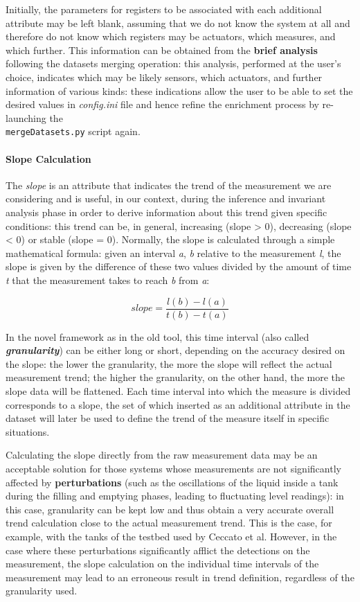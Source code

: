 Initially, the parameters for registers to be associated with each additional attribute may be left blank, assuming that we do not know the system at all and therefore do not know which registers may be actuators, which measures, and which further. This information can be obtained from the \textbf{brief analysis} following the datasets merging operation: this analysis, performed at the user's choice, indicates which may be likely sensors, which actuators, and further information of various kinds: these indications allow the user to be able to set the desired values in \textit{config.ini} file and hence refine the enrichment process by re-launching the\\ 
\texttt{mergeDatasets.py} script again.

\paragraph{Slope Calculation}
The \textit{slope} is an attribute that indicates the trend of the measurement we are considering and is useful, in our context, during the inference and invariant analysis phase in order to derive information about this trend given specific conditions: this trend can be, in general, increasing (slope > 0), decreasing (slope < 0) or stable (slope = 0).\newline
Normally, the slope is calculated through a simple mathematical formula: given an interval \textit{a}, \textit{b} relative to the measurement \textit{l}, the slope is given by the difference of these two values divided by the amount of time \textit{t} that the measurement takes to reach \textit{b} from \textit{a}:

\[slope = \frac{l(b) -l(a)}{t(b) - t(a)}\]

In the novel framework as in the old tool, this time interval (also called \textbf{\textit{granularity}}) can be either long or short, depending on the accuracy desired on the slope: the lower the granularity, the more the slope will reflect the actual measurement trend; the higher the granularity, on the other hand, the more the slope data will be flattened. Each time interval into which the measure is divided corresponds to a slope, the set of which inserted as an additional attribute in the dataset will later be used to define the trend of the measure itself in specific situations.

\bigskip
Calculating the slope directly from the raw measurement data may be an acceptable solution for those systems whose measurements are not significantly affected by \textbf{perturbations} (such as the oscillations of the liquid inside a tank during the filling and emptying phases, leading to fluctuating level readings): in this case, granularity can be kept low and thus obtain a very accurate overall trend calculation close to the actual measurement trend. This is the case, for example, with the tanks of the testbed used by Ceccato et al.\newline
However, in the case where these perturbations significantly afflict the detections on the measurement, the slope calculation on the individual time intervals of the measurement may lead to an erroneous result in trend definition, regardless of the granularity used.

